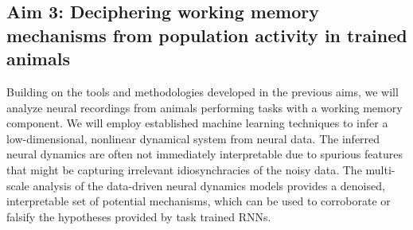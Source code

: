 \documentclass[12pt,letterpaper, onecolumn]{article}
\theoremstyle{definition}
\theoremstyle{remark}
\begin{document}
\subsection*{Aim 3: Deciphering working memory mechanisms from population activity in trained animals}
Building on the tools and methodologies developed in the previous aims, we will analyze neural recordings from animals performing tasks with a working memory component.
We will employ established machine learning techniques to infer a low-dimensional, nonlinear dynamical system from neural data.
The inferred neural dynamics are often not immediately interpretable due to spurious features that might be capturing irrelevant idiosynchracies of the noisy data. 
The multi-scale analysis of the data-driven neural dynamics models provides a denoised, interpretable set of potential mechanisms, which can be used to corroborate or falsify the hypotheses provided by task trained RNNs. 
\end{document}
